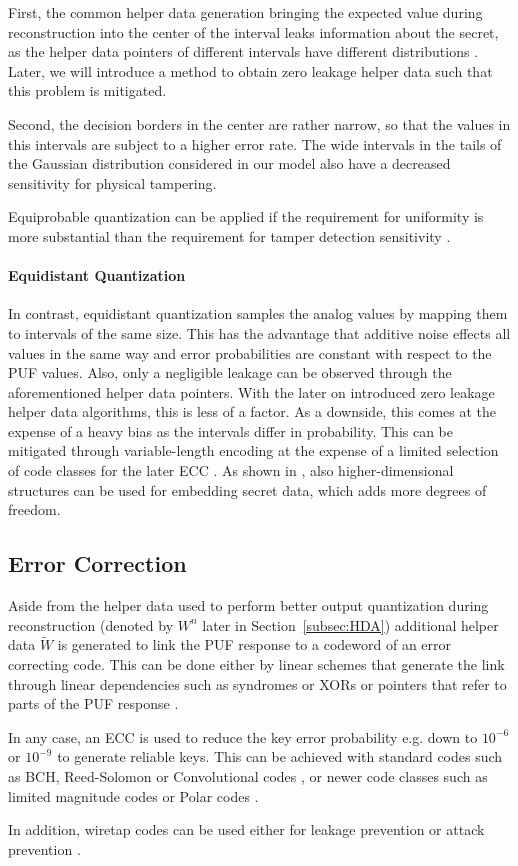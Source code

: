 First, the common helper data generation bringing the expected value during reconstruction into the center of the interval leaks information about the secret, as the helper data pointers of different intervals have different distributions \cite{IHKS16}. Later, we will introduce a method to obtain zero leakage helper data such that this problem is mitigated. 

Second, the decision borders in the center are rather narrow, so that the values in this intervals are subject to a higher error rate. The wide intervals in the tails of the Gaussian distribution considered in our model also have a decreased sensitivity for physical tampering.

Equiprobable quantization can be applied if the requirement for uniformity is more substantial than the requirement for tamper detection sensitivity \cite{GXKF22}.

\paragraph{Equidistant Quantization} In contrast, equidistant quantization samples the analog values by mapping them to intervals of the same size. This has the advantage that additive noise effects all values in the same way and error probabilities are constant with respect to the PUF values. Also, only a negligible leakage can be observed \cite{IHKS16} through the aforementioned helper data pointers. With the later on introduced zero leakage helper data algorithms, this is less of a factor. As a downside, this comes at the expense of a heavy bias as the intervals differ in probability. This can be mitigated through variable-length encoding at the expense of a limited selection of code classes for the later ECC \cite{IHL+18}.
As shown in \cite{BDH+10}, also higher-dimensional structures can be used for embedding secret data, which adds more degrees of freedom.

\subsection{Error Correction}

Aside from the helper data used to perform better output quantization during reconstruction (denoted by $W^n$ later in Section~\ref{subsec:HDA}) additional helper data $\widetilde{W}$ is generated to link the PUF response to a codeword of an error correcting code. 
This can be done either by linear schemes that generate the link through linear dependencies such as syndromes or XORs or pointers that refer to parts of the PUF response \cite{HKS20}.

In any case, an ECC is used to reduce the key error probability e.g. down to $10^{-6}$ or $10^{-9}$ to generate reliable keys. This can be achieved with standard codes such as BCH, Reed-Solomon or Convolutional codes \cite{MS77}, or newer code classes such as limited magnitude codes \cite{IU19} or Polar codes \cite{CIW+17,GXKF22}.

In addition, wiretap codes can be used either for leakage prevention \cite{HO17} or attack prevention \cite{GXKF22}.
